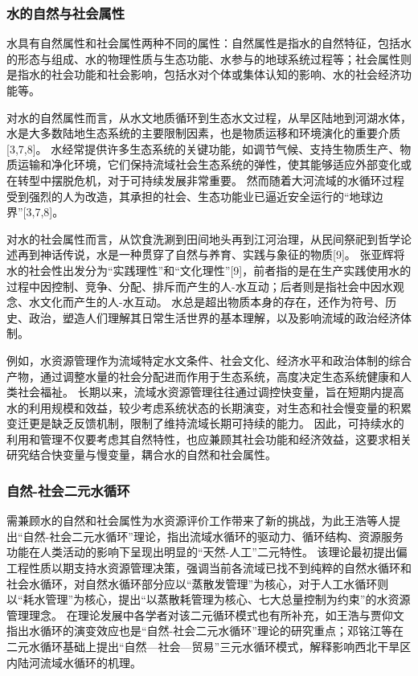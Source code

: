 

\subsubsection*{水的自然与社会属性}

水具有自然属性和社会属性两种不同的属性\cite{ning2004}：自然属性是指水的自然特征，包括水的形态与组成、水的物理性质与生态功能、水参与的地球系统过程等；社会属性则是指水的社会功能和社会影响，包括水对个体或集体认知的影响、水的社会经济功能等。

对水的自然属性而言，从水文地质循环到生态水文过程，从旱区陆地到河湖水体，水是大多数陆地生态系统的主要限制因素，也是物质运移和环境演化的重要介质[3,7,8]。
水经常提供许多生态系统的关键功能，如调节气候、支持生物质生产、物质运输和净化环境，它们保持流域社会生态系统的弹性，使其能够适应外部变化或在转型中摆脱危机，对于可持续发展非常重要。
然而随着大河流域的水循环过程受到强烈的人为改造，其承担的社会、生态功能业已逼近安全运行的“地球边界”[3,7,8]。

对水的社会属性而言，从饮食洗涮到田间地头再到江河治理，从民间祭祀到哲学论述再到神话传说，水是一种贯穿了自然与养育、实践与象征的物质[9]。
张亚辉将水的社会性出发分为“实践理性”和“文化理性”[9]，前者指的是在生产实践使用水的过程中因控制、竞争、分配、排斥而产生的人-水互动；后者则是指社会中因水观念、水文化而产生的人-水互动。
水总是超出物质本身的存在，还作为符号、历史、政治，塑造人们理解其日常生活世界的基本理解，以及影响流域的政治经济体制\cite{ballestero2019}。

例如，水资源管理作为流域特定水文条件、社会文化、经济水平和政治体制的综合产物，通过调整水量的社会分配进而作用于生态系统，高度决定生态系统健康和人类社会福祉。
长期以来，流域水资源管理往往通过调控快变量，旨在短期内提高水的利用规模和效益，较少考虑系统状态的长期演变，对生态和社会慢变量的积累变迁更是缺乏反馈机制，限制了维持流域长期可持续的能力。
因此，可持续水的利用和管理不仅要考虑其自然特性，也应兼顾其社会功能和经济效益，这要求相关研究结合快变量与慢变量，耦合水的自然和社会属性。

\subsubsection*{自然-社会二元水循环}

需兼顾水的自然和社会属性为水资源评价工作带来了新的挑战，为此王浩等人提出“自然-社会二元水循环”理论，指出流域水循环的驱动力、循环结构、资源服务功能在人类活动的影响下呈现出明显的“天然-人工”二元特性\cite{wang2006}。
该理论最初提出偏工程性质以期支持水资源管理决策，强调当前各流域已找不到纯粹的自然水循环和社会水循环，对自然水循环部分应以“蒸散发管理”为核心，对于人工水循环则以“耗水管理”为核心，提出“以蒸散耗管理为核心、七大总量控制为约束”的水资源管理理念\cite{wang2010}。
在理论发展中各学者对该二元循环模式也有所补充，如王浩与贾仰文指出水循环的演变效应也是“自然-社会二元水循环”理论的研究重点\cite{wang2016}；邓铭江等在二元水循环基础上提出“自然—社会—贸易”三元水循环模式，解释影响西北干旱区内陆河流域水循环的机理\cite{deng2020}。

